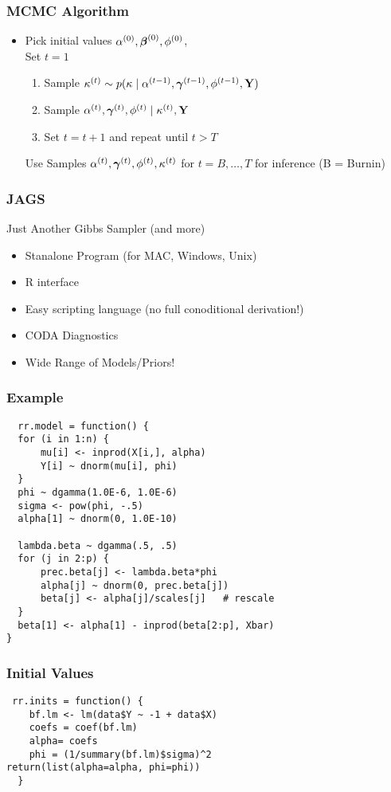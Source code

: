 \documentclass[]{beamer}
\begin{document}
\begin{frame}
  \frametitle{MCMC Algorithm}
  \begin{itemize}
  \item  Pick initial values $\alpha^{(0)}, \boldsymbol{\beta}^{(0)},
  \phi^{(0)}$, \pause \\
  Set  $t = 1$
  \begin{enumerate}
  \item Sample $\kappa^{(t)} \sim p(\kappa \mid \alpha^{(t-1)},
    \boldsymbol{\gamma}^{(t-1)}, \phi^{(t-1)}, \mathbf{Y})$ \pause
   \item Sample $\alpha^{(t)}, \boldsymbol{\gamma}^{(t)}, \phi^{(t)} \mid \kappa^{(t)},
     \mathbf{Y}$ \pause
 \item Set $t = t + 1$ and repeat until $t > T$ \pause
  \end{enumerate}
Use Samples  $\alpha^{(t)}, \boldsymbol{\gamma}^{(t)}, \phi^{(t)}, \kappa^{(t)}$ for $t
= B, \ldots, T$ for inference   (B = Burnin)
\end{itemize}
\end{frame}

\begin{frame}
  \frametitle{JAGS}
  Just Another Gibbs Sampler (and more)
  
  \begin{itemize}
  \item Stanalone Program (for MAC, Windows, Unix)
  \item R interface
  \item Easy scripting language (no full conoditional derivation!)
  \item CODA Diagnostics
  \item Wide Range of Models/Priors!  
  \end{itemize}
  
\end{frame}

\begin{frame}[fragile]
  \frametitle{Example}
\begin{verbatim}
  rr.model = function() {
  for (i in 1:n) {
      mu[i] <- inprod(X[i,], alpha)
      Y[i] ~ dnorm(mu[i], phi)
  }
  phi ~ dgamma(1.0E-6, 1.0E-6)
  sigma <- pow(phi, -.5) 
  alpha[1] ~ dnorm(0, 1.0E-10)

  lambda.beta ~ dgamma(.5, .5)  
  for (j in 2:p) {
      prec.beta[j] <- lambda.beta*phi
      alpha[j] ~ dnorm(0, prec.beta[j])
      beta[j] <- alpha[j]/scales[j]   # rescale
  }
  beta[1] <- alpha[1] - inprod(beta[2:p], Xbar)
}

\end{verbatim}

\end{frame}
\begin{frame}[fragile]
  \frametitle{Initial Values}
\begin{verbatim}
 rr.inits = function() {
    bf.lm <- lm(data$Y ~ -1 + data$X)
    coefs = coef(bf.lm)
    alpha= coefs
    phi = (1/summary(bf.lm)$sigma)^2
return(list(alpha=alpha, phi=phi))
  } 
\end{verbatim}
\end{frame}
\end{document}
